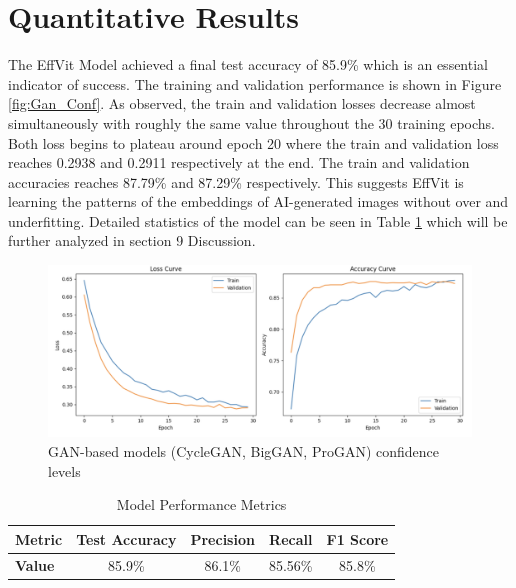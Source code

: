 \documentclass{article} %
\begin{document}

\section{Quantitative Results}
The EffVit Model achieved a final test accuracy of 85.9\% which is an essential indicator of success. The training and validation performance is shown in Figure \ref{fig:Gan_Conf}. As observed, the train and validation losses decrease almost simultaneously with roughly the same value throughout the 30 training epochs. Both loss begins to plateau around epoch 20 where the train and validation loss reaches 0.2938 and 0.2911 respectively at the end. The train and validation accuracies reaches 87.79\% and 87.29\% respectively. This suggests EffVit is learning the patterns of the embeddings of AI-generated images without over and underfitting. Detailed statistics of the model can be seen in Table \ref{tab:metrics} which will be further analyzed in section 9 Discussion.

\begin{figure}[h]
    \begin{center}
        \includegraphics[scale=0.27]{figs/training curves.png}
    \end{center}
    \caption{GAN-based models (CycleGAN, BigGAN, ProGAN) confidence levels}
    \label{fig:Training_Curves}
\end{figure}

\begin{table}[h]
    \centering
    \caption{Model Performance Metrics}
    \label{tab:metrics}
    \begin{tabular}{lcccc}
    \toprule
    \textbf{Metric} & \textbf{Test Accuracy} & \textbf{Precision} & \textbf{Recall} & \textbf{F1 Score} \\
    \midrule
    \textbf{Value}  & 85.9\%                & 86.1\%             & 85.56\%          & 85.8\%           \\
    \bottomrule
    \end{tabular}
    \end{table}
    
\end{document}
